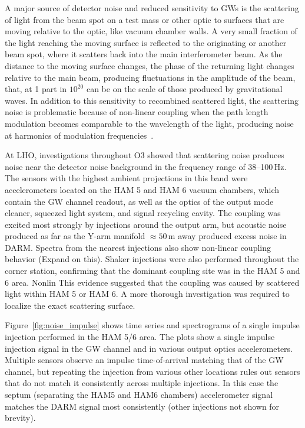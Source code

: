 A major source of detector noise and reduced sensitivity to \acp{GW} is the scattering of light from the beam spot on a test mass or other optic to surfaces that are moving relative to the optic, like vacuum chamber walls.
A very small fraction of the light reaching the moving surface is reflected to the originating or another beam spot, where it scatters back into the main interferometer beam.
As the distance to the moving surface changes, the phase of the returning light changes relative to the main beam, producing fluctuations in the amplitude of the beam, that, at 1 part in $10^{20}$ can be on the scale of those produced by gravitational waves.
In addition to this sensitivity to recombined scattered light, the scattering noise is problematic because of non-linear coupling when the path length modulation becomes comparable to the wavelength of the light, producing noise at harmonics of modulation frequencies~\citep{Soni_2020}.

At \ac{LHO}, investigations throughout \ac{O3} showed that scattering noise produces noise near the detector noise background in the frequency range of 38--100\,Hz.
The sensors with the highest ambient projections in this band were accelerometers located on the HAM 5 and HAM 6 vacuum chambers, which contain the \ac{GW} channel readout, as well as the optics of the output mode cleaner, squeezed light system, and signal recycling cavity.
The coupling was excited most strongly by injections around the output arm, but acoustic noise produced as far as the Y-arm manifold $\approx 50$\,m away produced excess noise in \ac{DARM}.
Spectra from the nearest injections also show non-linear coupling behavior ({\color{red}Expand on this}).
Shaker injections were also performed throughout the corner station, confirming that the dominant coupling site was in the HAM 5 and 6 area.
Nonlin
This evidence suggested that the coupling was caused by scattered light within HAM 5 or HAM 6.
A more thorough investigation was required to localize the exact scattering surface.

Figure~\ref{fig:noise_impulse} shows time series and spectrograms of a single impulse injection performed in the \ac{HAM} 5/6 area.
The plots show a single impulse injection signal in the \ac{GW} channel and in various output optics accelerometers.
Multiple sensors observe an impulse time-of-arrival matching that of the \ac{GW} channel, but repeating the injection from various other locations rules out sensors that do not match it consistently across multiple injections.
In this case the septum (separating the HAM5 and HAM6 chambers) accelerometer signal matches the \ac{DARM} signal most consistently (other injections not shown for brevity).

